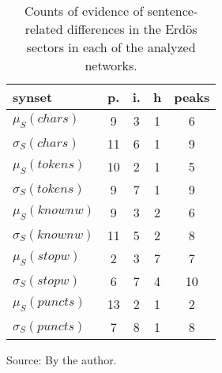 \begin{table}[h!]
\begin{center}
\caption{Counts of evidence of sentence-related differences in the Erd\"os sectors in each of the analyzed networks.}
	\def\arraystretch{1.5}
\begin{tabular}{l || c | c | c || c}\hline
{\bf synset} & {\bf p.} & {\bf i.} & {\bf h} & {\bf peaks} \\\hline\hline
$\mu_S(chars)$ & 9  & 3  & 1  & 6 \\
$\sigma_S(chars)$ & 11  & 6  & 1  & 9 \\\hline
$\mu_S(tokens)$ & 10  & 2  & 1  & 5 \\
$\sigma_S(tokens)$ & 9  & 7  & 1  & 9 \\\hline
$\mu_S(knownw)$ & 9  & 3  & 2  & 6 \\
$\sigma_S(knownw)$ & 11  & 5  & 2  & 8 \\\hline
$\mu_S(stopw)$ & 2  & 3  & 7  & 7 \\
$\sigma_S(stopw)$ & 6  & 7  & 4  & 10 \\\hline
$\mu_S(puncts)$ & 13  & 2  & 1  & 2 \\
$\sigma_S(puncts)$ & 7  & 8  & 1  & 8 \\\hline
\end{tabular}
\begin{flushleft}\footnotesize
		Source: By the author.\
\end{flushleft}
\end{center}
\end{table}
